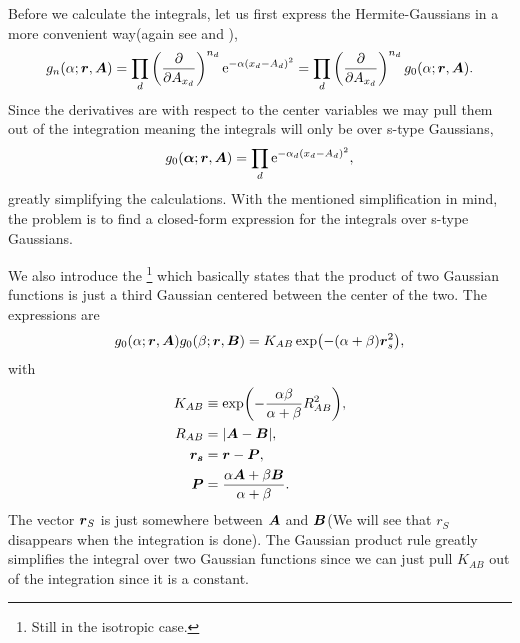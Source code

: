     Before we calculate the integrals, let us first express the
    Hermite-Gaussians in a more convenient way(again see
    \cite{HelgakerTaylorGauss} and \cite{HelgakerGauss}),
        \begin{equation}
            g_n(\alpha;\boldsymbol{{r}},\boldsymbol{{A}}) = \prod_d  \left(\frac{\mathrm{\partial}}{\mathrm{\partial} A_{x_d}}\right)^{n_d}
            \mathrm{e}^{-\alpha (x_d-A_d)^2} = \prod_d \left(\frac{\mathrm{\partial}}{\mathrm{\partial} A_{x_d}}\right)^{n_d}
            g_0(\alpha;\boldsymbol{{r}},\boldsymbol{{A}}).
            \label{eq:centerDerGauss}
        \end{equation}
    Since the derivatives are with respect to the center variables we may pull
    them out of the integration meaning the integrals will only be over s-type
    Gaussians,
        \begin{equation}
            g_0 (\boldsymbol{{\alpha}};\boldsymbol{{r}},\boldsymbol{{A}}) = \prod_d
            \mathrm{e}^{-\alpha_d(x_d-A_d)^2},
        \end{equation}
    greatly simplifying the calculations. With the mentioned simplification in
    mind, the problem is to find a closed-form expression for the integrals
    over s-type Gaussians.

    We also introduce the \footnote{Still in the
    isotropic case.} which basically states that the product of two Gaussian
    functions is just a third Gaussian centered between the center of the two.
    The expressions are
        \begin{equation}
            g_0(\alpha;\boldsymbol{{r}},\boldsymbol{{A}})g_0(\beta;\boldsymbol{{r}},\boldsymbol{{B}}) =
            K_{AB}\exp(-(\alpha+\beta)\boldsymbol{{r}}^2_s),
            \label{eq:gaussianProductRule}
        \end{equation}
    with
        \begin{equation}
            \begin{aligned}
                K_{AB} &\equiv \exp(-\frac{\alpha\beta}{\alpha+\beta}R^2_{AB}),
                \\
                R_{AB} &= \abs{\boldsymbol{{A}} - \boldsymbol{{B}}}, \\
                \boldsymbol{{r_s}} &= \boldsymbol{{r}} - \boldsymbol{{P}}, \\
                \boldsymbol{{P}} &= \frac{\alpha\boldsymbol{{A}} +
                \beta\boldsymbol{{B}}}{\alpha + \beta}.
            \end{aligned}
        \end{equation}
    The vector $\boldsymbol{{r}}_S$ is just somewhere between $\boldsymbol{{A}}$ and
    $\boldsymbol{{B}}$(We will see that $r_S$ disappears when the integration is done).
    The Gaussian product rule greatly simplifies the integral over two Gaussian
    functions since we can just pull $K_{AB}$ out of the integration since it
    is a constant.

